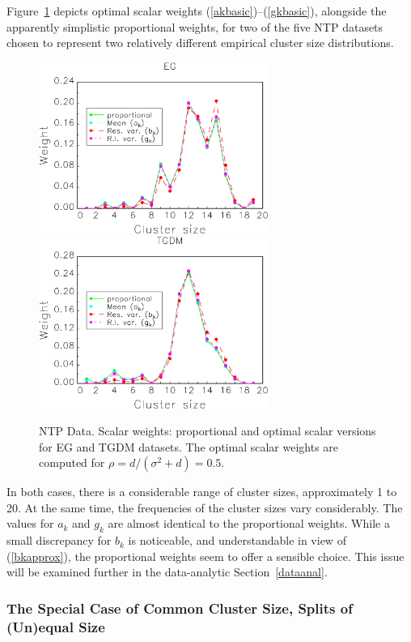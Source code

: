\documentclass[11pt,a5paper,twoside]{book}
\begin{document}
Figure~\ref{ntpweightfigure} depicts optimal scalar weights 
(\ref{akbasic})--(\ref{gkbasic}), alongside the apparently simplistic 
proportional weights, for two of the five NTP datasets 
chosen  to represent two relatively different empirical cluster 
size distributions.
\begin{figure}[t]
\begin{center}
\includegraphics[width=7.5cm]{egclipped.eps}
\includegraphics[width=7.5cm]{tgdmclipped.eps}
\caption{\small \linespread{1.1} NTP Data. Scalar weights: proportional and optimal scalar versions for EG and TGDM datasets. The optimal scalar weights are computed for $\rho=d/(\sigma^2+d)=0.5$.}
\label{ntpweightfigure}
\end{center}
\end{figure}
In both cases, there is a considerable range of cluster sizes, approximately 
1 to 20. At the same time, the frequencies of the cluster sizes vary 
considerably. The values for $a_k$ and $g_k$ are almost identical to 
the proportional weights. While a small discrepancy for $b_k$ is 
noticeable, and understandable in view of (\ref{bkapprox}), the 
proportional weights seem to offer a sensible choice. This issue 
will be examined further in the data-analytic Section~\ref{dataanal}.

\subsubsection{The Special Case of Common Cluster Size, Splits of (Un)equal Size}
\label{horizontal}
\end{document}

